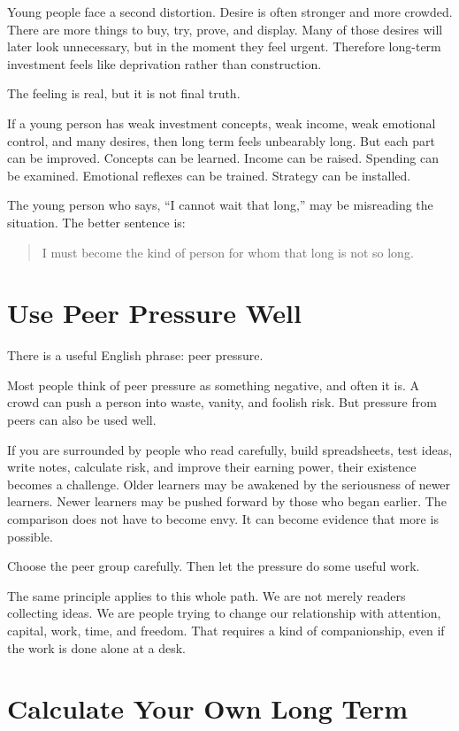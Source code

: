 Young people face a second distortion. Desire is often stronger and more crowded. There are more things to buy, try, prove, and display. Many of those desires will later look unnecessary, but in the moment they feel urgent. Therefore long-term investment feels like deprivation rather than construction.

The feeling is real, but it is not final truth.

If a young person has weak investment concepts, weak income, weak emotional control, and many desires, then long term feels unbearably long. But each part can be improved. Concepts can be learned. Income can be raised. Spending can be examined. Emotional reflexes can be trained. Strategy can be installed.

The young person who says, ``I cannot wait that long,'' may be misreading the situation. The better sentence is:

\begin{quote}
I must become the kind of person for whom that long is not so long.
\end{quote}

\section*{Use Peer Pressure Well}

There is a useful English phrase: peer pressure.

Most people think of peer pressure as something negative, and often it is. A crowd can push a person into waste, vanity, and foolish risk. But pressure from peers can also be used well.

If you are surrounded by people who read carefully, build spreadsheets, test ideas, write notes, calculate risk, and improve their earning power, their existence becomes a challenge. Older learners may be awakened by the seriousness of newer learners. Newer learners may be pushed forward by those who began earlier. The comparison does not have to become envy. It can become evidence that more is possible.

Choose the peer group carefully. Then let the pressure do some useful work.

The same principle applies to this whole path. We are not merely readers collecting ideas. We are people trying to change our relationship with attention, capital, work, time, and freedom. That requires a kind of companionship, even if the work is done alone at a desk.

\section*{Calculate Your Own Long Term}

